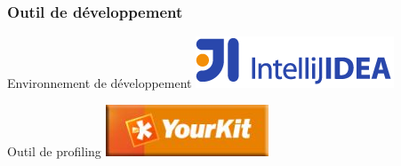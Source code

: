 \begin{frame}\frametitle{Outil de développement}
\begin{centering}
	\begin{minipage}[c]{.6\linewidth}
		\begin{beamerboxesrounded}[shadow=true,center]{Environnement de développement}
			\centering
			\includegraphics[width=.4\linewidth]{../image/intellijLogo.png}
		\end{beamerboxesrounded}
	\end{minipage}
	\vfill
	\begin{minipage}[c]{.6\linewidth}
		\begin{beamerboxesrounded}[shadow=true,center]{Outil de profiling}
			\centering
			\includegraphics[width=.3\linewidth]{../image/yourkit.jpg}
		\end{beamerboxesrounded}
	\end{minipage}
	\vfill

\end{centering}
\end{frame}
